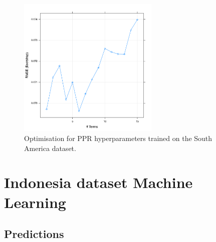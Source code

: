 \documentclass[review]{elsarticle}
\begin{document}
\begin{figure}[h!]
  \centering
  \includegraphics[width=0.6\textwidth]{figs/SI/ppropt_sa.png}
\caption{
  Optimisation for PPR hyperparameters trained on the South America dataset.
}

\end{figure}












\clearpage
\section{Indonesia dataset Machine Learning}



\subsection{Predictions}
\end{document}
